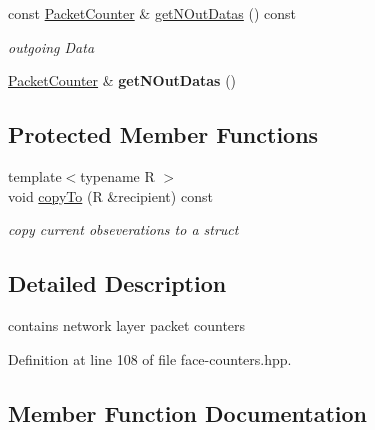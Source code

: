 \begin{DoxyCompactItemize}
\item 
const \hyperlink{classnfd_1_1PacketCounter}{Packet\+Counter} \& \hyperlink{classnfd_1_1NetworkLayerCounters_a46c0cefb07b33135867d78e73e480b4b}{get\+N\+Out\+Datas} () const\hypertarget{classnfd_1_1NetworkLayerCounters_a46c0cefb07b33135867d78e73e480b4b}{}\label{classnfd_1_1NetworkLayerCounters_a46c0cefb07b33135867d78e73e480b4b}

\begin{DoxyCompactList}\small\item\em outgoing Data \end{DoxyCompactList}\item 
\hyperlink{classnfd_1_1PacketCounter}{Packet\+Counter} \& {\bfseries get\+N\+Out\+Datas} ()\hypertarget{classnfd_1_1NetworkLayerCounters_a4d4304cfbe10840ba626033ffe5bcbb6}{}\label{classnfd_1_1NetworkLayerCounters_a4d4304cfbe10840ba626033ffe5bcbb6}

\end{DoxyCompactItemize}
\subsection*{Protected Member Functions}
\begin{DoxyCompactItemize}
\item 
{\footnotesize template$<$typename R $>$ }\\void \hyperlink{classnfd_1_1NetworkLayerCounters_a56053ab376d35df32ddcb2e45678b09f}{copy\+To} (R \&recipient) const
\begin{DoxyCompactList}\small\item\em copy current obseverations to a struct \end{DoxyCompactList}\end{DoxyCompactItemize}


\subsection{Detailed Description}
contains network layer packet counters 

Definition at line 108 of file face-\/counters.\+hpp.



\subsection{Member Function Documentation}
